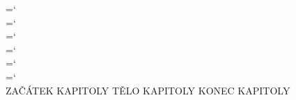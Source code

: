 \documentclass[10pt,draft]{book}
\begin{document}
%
%
\pagestyle{normalni}%
%
{%
    \selectfont\hyphenchar\font=`\\%
    \selectfont\hyphenchar\font=`\\%
    \selectfont\hyphenchar\font=`\\%
    \selectfont\hyphenchar\font=`\\%
    \selectfont\hyphenchar\font=`\\%
    \selectfont\hyphenchar\font=`\\%
}%
%
\raggedbottom%
{{ZAČÁTEK KAPITOLY}}
{{TĚLO KAPITOLY}}
{{KONEC KAPITOLY}}
\end{document}
